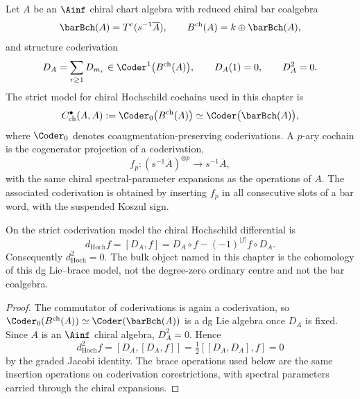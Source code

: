 \begin{definition}
\label{def:chiral-hochschild-coderivations}
Let $A$ be an $\Ainf$ chiral chart algebra with reduced chiral bar
coalgebra
\[
\barBch(A)=T^c(s^{-1}\overline A),
\qquad
B^{\mathrm{ch}}(A)=k\oplus\barBch(A),
\]
and structure coderivation
\[
D_A=\sum_{r\geq 1}D_{m_r}
\in \Coder^1\bigl(B^{\mathrm{ch}}(A)\bigr),
\qquad
D_A(1)=0,\qquad D_A^2=0.
\]
The strict model for chiral Hochschild cochains used in this chapter is
\[
C^\bullet_{\mathrm{ch}}(A,A)
:=\Coder_0\bigl(B^{\mathrm{ch}}(A)\bigr)
\simeq
\Coder\bigl(\barBch(A)\bigr),
\]
where \(\Coder_0\) denotes coaugmentation-preserving coderivations.
A $p$-ary cochain is the cogenerator projection of a coderivation,
\[
f_p\colon (s^{-1}\overline A)^{\otimes p}\longrightarrow s^{-1}\overline A,
\]
with the same chiral spectral-parameter expansions as the operations
of $A$. The associated coderivation is obtained by inserting $f_p$ in
all consecutive slots of a bar word, with the suspended Koszul sign.
\end{definition}

\begin{proposition}
\label{prop:hochschild-differential-coderivation}
On the strict coderivation model the chiral Hochschild differential is
\[
d_{\mathrm{Hoch}} f=[D_A,f]
=D_A\circ f-(-1)^{|f|}f\circ D_A .
\]
Consequently $d_{\mathrm{Hoch}}^2=0$. The bulk object named in this
chapter is the cohomology of this dg Lie--brace model, not the
degree-zero ordinary centre and not the bar coalgebra.
\end{proposition}

\begin{proof}
The commutator of coderivations is again a coderivation, so
\(\Coder_0(B^{\mathrm{ch}}(A))\simeq\Coder(\barBch(A))\) is a dg Lie
algebra once \(D_A\) is fixed. Since \(A\) is an \(\Ainf\) chiral
algebra, \(D_A^2=0\). Hence
\[
d_{\mathrm{Hoch}}^2f=[D_A,[D_A,f]]
=\tfrac12[[D_A,D_A],f]=0
\]
by the graded Jacobi identity. The brace operations used below are the
same insertion operations on coderivation corestrictions, with
spectral parameters carried through the chiral expansions.
\end{proof}

